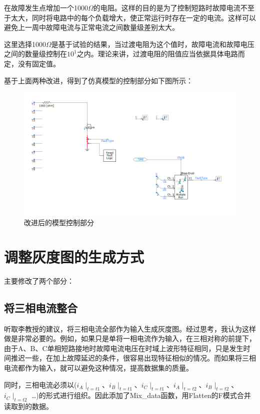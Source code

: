 \documentclass{article}
\begin{document}
	在故障发生点增加一个1000$\Omega$的电阻。这样的目的是为了控制短路时故障电流不至于太大，同时将电路中的每个负载增大，使正常运行时存在一定的电流。这样可以避免上一周中故障电流与正常电流之间数量级差别太大。
	
	这里选择1000$\Omega$是基于试验的结果，当过渡电阻为这个值时，故障电流和故障电压之间的数量级控制在$10^{1}$之内。理论来讲，过渡电阻的阻值应当依据具体电路而定，没有固定值。
	
	基于上面两种改进，得到了仿真模型的控制部分如下图所示：
	
	\begin{figure}[h]
		\centering
		\includegraphics[width=13cm]{figure/1.png}
		\caption{改进后的模型控制部分}
	\end{figure}
	
	\section{调整灰度图的生成方式}
	
	主要修改了两个部分：
	
	\subsection{将三相电流整合}
	
	听取李教授的建议，将三相电流全部作为输入生成灰度图。经过思考，我认为这样做是非常必要的。例如，如果只是单将一相电流作为输入，在三相对称的前提下，由于A、B、C单相短路接地时故障电流电压在时域上波形特征相同，只是发生时间推迟一些，在加上故障延迟的条件，很容易出现特征相似的情况。而如果将三相电流都作为输入，就可以避免这种情况，提高数据集的质量。
	
	同时，三相电流必须以($i_{A}\mid_{t=t1}$、$i_{B}\mid_{t=t1}$、$i_{C}\mid_{t=t1}$、$i_{A}\mid_{t=t2}$、$i_{B}\mid_{t=t2}$、$i_{C}\mid_{t=t2}$ \dots )的形式进行组织。因此添加了Mix\_data函数，用Flatten的F模式合并读取到的数据。
	
\end{document}
